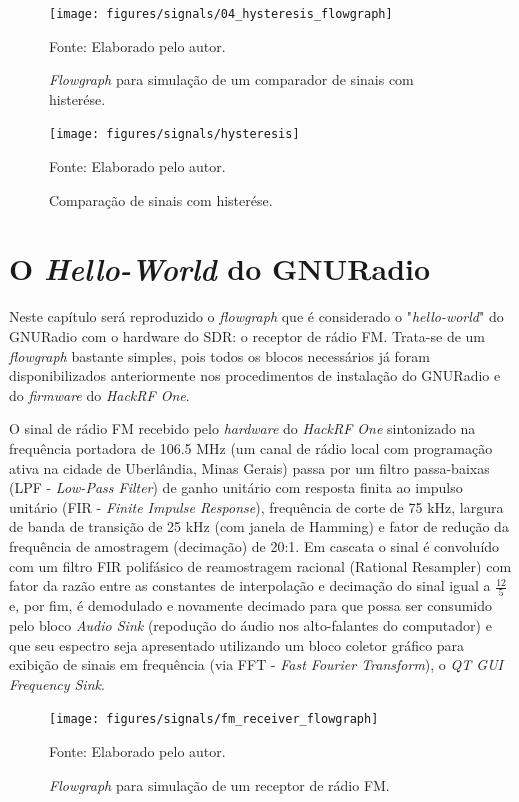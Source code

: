 \documentclass[
  12pt,				%
  openright,			%
  twoside,			%
  a4paper,			%
  english,			%
  french,				%
  spanish,			%
  brazil,				%
  ]{abntex2}
\begin{document}
\begin{figure}[!htb]
  \centering
  \caption{\textit{Flowgraph} para simulação de um comparador de sinais com histerése.}
  \texttt{[image: figures/signals/04\_hysteresis\_flowgraph]}

  Fonte: Elaborado pelo autor.
  \label{fig:gnuradio_hysteresis_flowgraph}
\end{figure}

\begin{figure}[!htb]
  \centering
  \caption{Comparação de sinais com histerése.}
  \texttt{[image: figures/signals/hysteresis]}

  Fonte: Elaborado pelo autor.
  \label{fig:gnuradio_hysteresis}
\end{figure}

\chapter{O \textit{Hello-World} do GNURadio}

Neste capítulo será reproduzido o \textit{flowgraph} que é considerado o "\textit{hello-world}" do GNURadio com o hardware do SDR: o receptor de rádio FM. Trata-se de um \textit{flowgraph}
bastante simples, pois todos os blocos necessários já foram disponibilizados anteriormente nos procedimentos de instalação do GNURadio e do \textit{firmware} do \textit{HackRF One}.

O sinal de rádio FM recebido pelo \textit{hardware} do \textit{HackRF One} sintonizado na frequência portadora de 106.5 MHz (um canal de rádio local com programação ativa na cidade
de Uberlândia, Minas Gerais) passa por um filtro passa-baixas (LPF - \textit{Low-Pass Filter}) de ganho unitário com resposta finita ao impulso unitário
(FIR - \textit{Finite Impulse Response}), frequência de corte de 75 kHz, largura de banda de transição de 25 kHz (com janela de Hamming) e fator de redução da frequência de amostragem
(decimação) de 20:1. Em cascata o sinal é convoluído com um filtro FIR polifásico de reamostragem racional (Rational Resampler) com fator da razão entre as constantes de interpolação
e decimação do sinal igual a $\frac{12}{5}$ e, por fim, é demodulado e novamente decimado para que possa ser consumido pelo bloco \textit{Audio Sink} (repodução do áudio nos
alto-falantes do computador) e que seu espectro seja apresentado utilizando um bloco coletor gráfico para exibição de sinais em frequência (via FFT - \textit{Fast Fourier Transform}),
o \textit{QT GUI Frequency Sink}.

\begin{figure}[!htb]
  \centering
  \caption{\textit{Flowgraph} para simulação de um receptor de rádio FM.}
  \texttt{[image: figures/signals/fm\_receiver\_flowgraph]}
  \label{fig:gnuradio_fm_receiver_flowgraph}

  Fonte: Elaborado pelo autor.
\end{figure}
\end{document}
